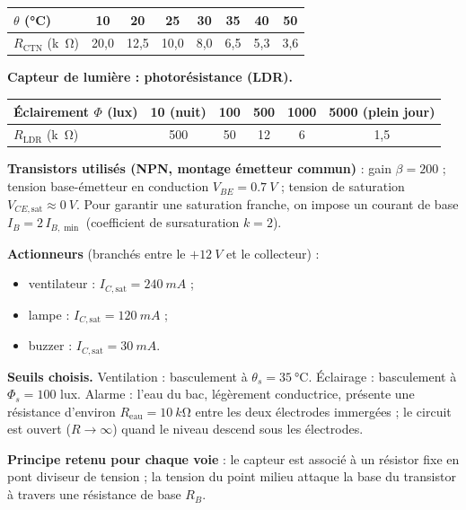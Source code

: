 \documentclass[11pt]{article}
\newcommand{\cle}[1]{{\popxbold\color{popdark}#1}}
\begin{document}
\begin{center}
\begin{tabular}{|l|c|c|c|c|c|c|c|}
\hline
\rowcolor{popblueL} $\theta$ (\si{\celsius}) & 10 & 20 & 25 & 30 & 35 & 40 & 50 \\
\hline $R_{\text{CTN}}$ (\si{k\ohm}) & 20,0 & 12,5 & 10,0 & 8,0 & 6,5 & 5,3 & 3,6 \\
\hline
\end{tabular}
\end{center}

\textbf{Capteur de lumière : photorésistance (LDR).}

\begin{center}
\begin{tabular}{|l|c|c|c|c|c|}
\hline
\rowcolor{popblueL} Éclairement $\Phi$ (lux) & 10 (nuit) & 100 & 500 & 1000 & 5000 (plein jour) \\
\hline $R_{\text{LDR}}$ (\si{k\ohm}) & 500 & 50 & 12 & 6 & 1,5 \\
\hline
\end{tabular}
\end{center}

\textbf{Transistors utilisés (NPN, montage émetteur commun)} : gain $\beta = 200$ ; tension base-émetteur en conduction $V_{BE} = \SI{0,7}{V}$ ; tension de saturation $V_{CE,\text{sat}} \approx \SI{0}{V}$. Pour garantir une saturation franche, on impose un courant de base $I_B = 2\,I_{B,\min}$ (coefficient de sursaturation $k = 2$).

\textbf{Actionneurs} (branchés entre le $+\SI{12}{V}$ et le collecteur) :
\begin{itemize}
\item ventilateur : $I_{C,\text{sat}} = \SI{240}{mA}$ ;
\item lampe : $I_{C,\text{sat}} = \SI{120}{mA}$ ;
\item buzzer : $I_{C,\text{sat}} = \SI{30}{mA}$.
\end{itemize}

\textbf{Seuils choisis.} Ventilation : basculement à $\theta_s = \SI{35}{\celsius}$. Éclairage : basculement à $\Phi_s = 100$ lux. Alarme : l'eau du bac, légèrement conductrice, présente une résistance d'environ $R_{\text{eau}} = \SI{10}{k\ohm}$ entre les deux électrodes immergées ; le circuit est ouvert ($R \to \infty$) quand le niveau descend sous les électrodes.

\textbf{Principe retenu pour chaque voie} : le capteur est associé à un résistor fixe en \cle{pont diviseur de tension} ; la tension du point milieu attaque la base du transistor à travers une résistance de base $R_B$.
\end{document}
